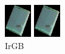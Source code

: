 \documentclass[a4paper,12pt]{article}  %
\begin{document}
\begin{figure}[H]
\begin{minipage}{0.24\textwidth}
        \includegraphics[width=\linewidth]{spektralne/irgb_budynek0.png}
        \caption*{IrGB}
    \end{minipage}
    \begin{minipage}{0.24\textwidth}
        \centering
        \includegraphics[width=\linewidth]{spektralne/irgb_budynek0.png}

\end{minipage}
\end{figure}
\end{document}
